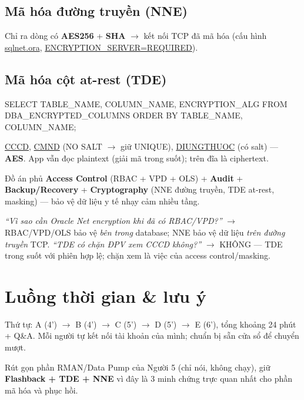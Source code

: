 \documentclass[12pt,a4paper]{article}
\DeclareRobustCommand{\code}[1]{\begingroup\urlstyle{tt}\url{#1}\endgroup}
\newcommand{\ra}{$\rightarrow$}
\begin{document}
\subsection{Mã hóa đường truyền (NNE)}
Chỉ ra dòng có \textbf{AES256} + \textbf{SHA} \ra{} kết nối TCP đã mã hóa (cấu hình \code{sqlnet.ora},
\code{ENCRYPTION_SERVER=REQUIRED}).

\subsection{Mã hóa cột at-rest (TDE)}
\begin{Code}
SELECT TABLE_NAME, COLUMN_NAME, ENCRYPTION_ALG
FROM   DBA_ENCRYPTED_COLUMNS ORDER BY TABLE_NAME, COLUMN_NAME;
\end{Code}
\code{CCCD}, \code{CMND} (NO SALT \ra{} giữ UNIQUE), \code{DIUNGTHUOC} (có salt) — \textbf{AES}. App vẫn đọc
plaintext (giải mã trong suốt); trên đĩa là ciphertext.

\begin{keybox}[title={Kết luận}]
Đồ án phủ \textbf{Access Control} (RBAC + VPD + OLS) + \textbf{Audit} + \textbf{Backup/Recovery} +
\textbf{Cryptography} (NNE đường truyền, TDE at-rest, masking) — bảo vệ dữ liệu y tế nhạy cảm nhiều tầng.
\end{keybox}

\begin{warnbox}[title={Có thể bị hỏi}]
\textit{``Vì sao cần Oracle Net encryption khi đã có RBAC/VPD?''} \ra{} RBAC/VPD/OLS bảo vệ \emph{bên trong}
database; NNE bảo vệ dữ liệu \emph{trên đường truyền} TCP. \quad \textit{``TDE có chặn ĐPV xem CCCD không?''}
\ra{} KHÔNG — TDE trong suốt với phiên hợp lệ; chặn xem là việc của access control/masking.
\end{warnbox}

\section{Luồng thời gian \& lưu ý}

Thứ tự: A (4') \ra{} B (4') \ra{} C (5') \ra{} D (5') \ra{} E (6'), tổng khoảng 24 phút + Q\&A. Mỗi người tự
kết nối tài khoản của mình; chuẩn bị sẵn cửa sổ để chuyển mượt.

\begin{riskbox}[title={Nếu thiếu thời gian}]
Rút gọn phần RMAN/Data Pump của Người 5 (chỉ nói, không chạy), giữ \textbf{Flashback + TDE + NNE} vì đây
là 3 minh chứng trực quan nhất cho phần mã hóa và phục hồi.
\end{riskbox}
\end{document}
